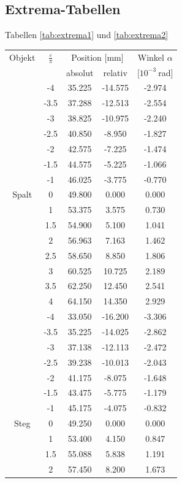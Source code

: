 \documentclass[12pt,a4paper,titlepage,headinclude,bibtotoc]{scrartcl}
\begin{document}
\subsection{Extrema-Tabellen}
Tabellen \ref{tab:extrema1} und \ref{tab:extrema2}
\begin{table}[!htb]
	\centering
	\begin{tabular}{|c||c|c|c|c|}
		\hline		
		Objekt & $\frac{\varepsilon}{\pi}$ & \multicolumn{2}{c}{Position [mm]} & Winkel $\alpha$ \\
		& & absolut & relativ & [$10^{-3}~$rad] \\
		\hline
		\hline
		&	-4	&	35.225	&	-14.575	&	-2.974	\\
		&	-3.5	&	37.288	&	-12.513	&	-2.554	\\
		&	-3	&	38.825	&	-10.975	&	-2.240	\\
		&	-2.5	&	40.850	&	-8.950	&	-1.827	\\
		&	-2	&	42.575	&	-7.225	&	-1.474	\\
		&	-1.5	&	44.575	&	-5.225	&	-1.066	\\
		&	-1	&	46.025	&	-3.775	&	-0.770	\\
		Spalt &	0	&	49.800	&	0.000	&	0.000	\\
		&	1	&	53.375	&	3.575	&	0.730	\\
		&	1.5	&	54.900	&	5.100	&	1.041	\\
		&	2	&	56.963	&	7.163	&	1.462	\\
		&	2.5	&	58.650	&	8.850	&	1.806	\\
		&	3	&	60.525	&	10.725	&	2.189	\\
		&	3.5	&	62.250	&	12.450	&	2.541	\\
		&	4	&	64.150	&	14.350	&	2.929	\\
		\hline
		&	-4	&	33.050	&	-16.200	&	-3.306	\\
		&	-3.5	&	35.225	&	-14.025	&	-2.862	\\
		&	-3	&	37.138	&	-12.113	&	-2.472	\\
		&	-2.5	&	39.238	&	-10.013	&	-2.043	\\
		&	-2	&	41.175	&	-8.075	&	-1.648	\\
		&	-1.5	&	43.475	&	-5.775	&	-1.179	\\
		&	-1	&	45.175	&	-4.075	&	-0.832	\\
		Steg &	0	&	49.250	&	0.000	&	0.000	\\
		&	1	&	53.400	&	4.150	&	0.847	\\
		&	1.5	&	55.088	&	5.838	&	1.191	\\
		&	2	&	57.450	&	8.200	&	1.673	\\

\end{tabular}
\end{table}
\end{document}
